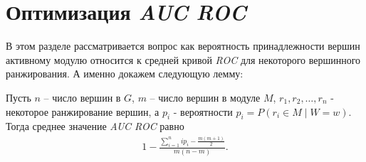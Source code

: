 \section{Оптимизация \emph{AUC ROC}}
В этом разделе рассматривается вопрос как вероятность принадлежности вершин
активному модулю относится к средней кривой \emph{ROC} для некоторого
вершинного ранжирования.  А именно докажем следующую лемму:
\begin{lemma}
\label{lem:auc}
Пусть $n$ -- число вершин в $G$, $m$ -- число вершин в модуле $M$,
$r_1, r_2, \dots, r_n$ - некоторое ранжирование вершин, а $p_i$ - вероятности
$p_i = P (r_i \in M \mid W = w)$.  Тогда среднее значение \emph{AUC ROC} равно
\begin{align*}
    1 - \frac{\sum_{i=1}^{n} i p_i - \frac{m(m+1)}{2}}{m(n-m)}.
\end{align*}
\end{lemma}
